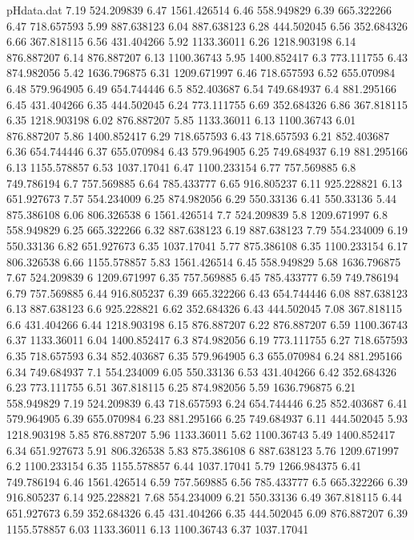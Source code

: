 \begin{filecontents}{pHdata.dat}
7.19	524.209839
6.47	1561.426514
6.46	558.949829
6.39	665.322266
6.47	718.657593
5.99	887.638123
6.04	887.638123
6.28	444.502045
6.56	352.684326
6.66	367.818115
6.56	431.404266
5.92	1133.36011
6.26	1218.903198
6.14	876.887207
6.14	876.887207
6.13	1100.36743
5.95	1400.852417
6.3	773.111755
6.43	874.982056
5.42	1636.796875
6.31	1209.671997
6.46	718.657593
6.52	655.070984
6.48	579.964905
6.49	654.744446
6.5	852.403687
6.54	749.684937
6.4	881.295166
6.45	431.404266
6.35	444.502045
6.24	773.111755
6.69	352.684326
6.86	367.818115
6.35	1218.903198
6.02	876.887207
5.85	1133.36011
6.13	1100.36743
6.01	876.887207
5.86	1400.852417
6.29	718.657593
6.43	718.657593
6.21	852.403687
6.36	654.744446
6.37	655.070984
6.43	579.964905
6.25	749.684937
6.19	881.295166
6.13	1155.578857
6.53	1037.17041
6.47	1100.233154
6.77	757.569885
6.8	749.786194
6.7	757.569885
6.64	785.433777
6.65	916.805237
6.11	925.228821
6.13	651.927673
7.57	554.234009
6.25	874.982056
6.29	550.33136
6.41	550.33136
5.44	875.386108
6.06	806.326538
6	1561.426514
7.7	524.209839
5.8	1209.671997
6.8	558.949829
6.25	665.322266
6.32	887.638123
6.19	887.638123
7.79	554.234009
6.19	550.33136
6.82	651.927673
6.35	1037.17041
5.77	875.386108
6.35	1100.233154
6.17	806.326538
6.66	1155.578857
5.83	1561.426514
6.45	558.949829
5.68	1636.796875
7.67	524.209839
6	1209.671997
6.35	757.569885
6.45	785.433777
6.59	749.786194
6.79	757.569885
6.44	916.805237
6.39	665.322266
6.43	654.744446
6.08	887.638123
6.13	887.638123
6.6	925.228821
6.62	352.684326
6.43	444.502045
7.08	367.818115
6.6	431.404266
6.44	1218.903198
6.15	876.887207
6.22	876.887207
6.59	1100.36743
6.37	1133.36011
6.04	1400.852417
6.3	874.982056
6.19	773.111755
6.27	718.657593
6.35	718.657593
6.34	852.403687
6.35	579.964905
6.3	655.070984
6.24	881.295166
6.34	749.684937
7.1	554.234009
6.05	550.33136
6.53	431.404266
6.42	352.684326
6.23	773.111755
6.51	367.818115
6.25	874.982056
5.59	1636.796875
6.21	558.949829
7.19	524.209839
6.43	718.657593
6.24	654.744446
6.25	852.403687
6.41	579.964905
6.39	655.070984
6.23	881.295166
6.25	749.684937
6.11	444.502045
5.93	1218.903198
5.85	876.887207
5.96	1133.36011
5.62	1100.36743
5.49	1400.852417
6.34	651.927673
5.91	806.326538
5.83	875.386108
6	887.638123
5.76	1209.671997
6.2	1100.233154
6.35	1155.578857
6.44	1037.17041
5.79	1266.984375
6.41	749.786194
6.46	1561.426514
6.59	757.569885
6.56	785.433777
6.5	665.322266
6.39	916.805237
6.14	925.228821
7.68	554.234009
6.21	550.33136
6.49	367.818115
6.44	651.927673
6.59	352.684326
6.45	431.404266
6.35	444.502045
6.09	876.887207
6.39	1155.578857
6.03	1133.36011
6.13	1100.36743
6.37	1037.17041

\end{filecontents}

